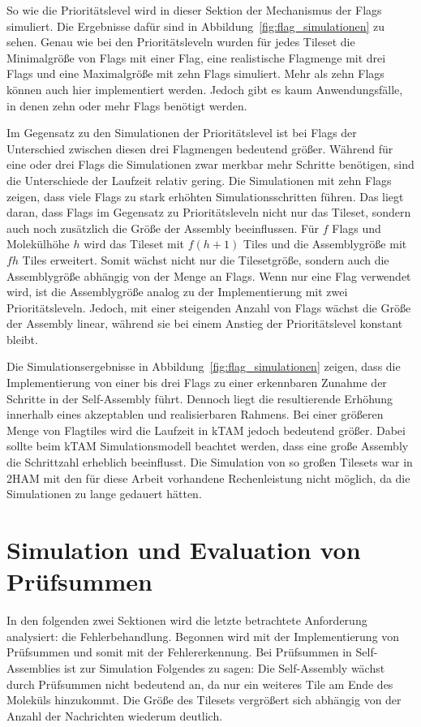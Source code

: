 So wie die Prioritätslevel wird in dieser Sektion der Mechanismus der Flags simuliert. Die Ergebnisse dafür sind in Abbildung~\ref{fig:flag_simulationen} zu sehen. Genau wie bei den Prioritätsleveln wurden für jedes Tileset die Minimalgröße von Flags mit einer Flag, eine realistische Flagmenge mit drei Flags und eine Maximalgröße mit zehn Flags simuliert. Mehr als zehn Flags können auch hier implementiert werden. Jedoch gibt es kaum Anwendungsfälle, in denen zehn oder mehr Flags benötigt werden. 

Im Gegensatz zu den Simulationen der Prioritätslevel ist bei Flags der Unterschied zwischen diesen drei Flagmengen bedeutend größer. Während für eine oder drei Flags die Simulationen zwar merkbar mehr Schritte benötigen, sind die Unterschiede der Laufzeit relativ gering. Die Simulationen mit zehn Flags zeigen, dass viele Flags zu stark erhöhten Simulationsschritten führen. Das liegt daran, dass Flags im Gegensatz zu Prioritätsleveln nicht nur das Tileset, sondern auch noch zusätzlich die Größe der Assembly beeinflussen. Für $f$ Flags und Molekülhöhe $h$ wird das Tileset mit $f(h+1)$ Tiles und die Assemblygröße mit $fh$ Tiles erweitert. Somit wächst nicht nur die Tilesetgröße, sondern auch die Assemblygröße abhängig von der Menge an Flags. Wenn nur eine Flag verwendet wird, ist die Assemblygröße analog zu der Implementierung mit zwei Prioritätsleveln. Jedoch, mit einer steigenden Anzahl von Flags wächst die Größe der Assembly linear, während sie bei einem Anstieg der Prioritätslevel konstant bleibt.

Die Simulationsergebnisse in Abbildung~\ref{fig:flag_simulationen} zeigen, dass die Implementierung von einer bis drei Flags zu einer erkennbaren Zunahme der Schritte in der Self-Assembly führt. Dennoch liegt die resultierende Erhöhung innerhalb eines akzeptablen und realisierbaren Rahmens. Bei einer größeren Menge von Flagtiles wird die Laufzeit in kTAM jedoch bedeutend größer. Dabei sollte beim kTAM Simulationsmodell beachtet werden, dass eine große Assembly die Schrittzahl erheblich beeinflusst. Die Simulation von so großen Tilesets war in 2HAM mit den für diese Arbeit vorhandene Rechenleistung nicht möglich, da die Simulationen zu lange gedauert hätten.

\section{Simulation und Evaluation von Prüfsummen}

In den folgenden zwei Sektionen wird die letzte betrachtete Anforderung analysiert: die Fehlerbehandlung. Begonnen wird mit der Implementierung von Prüfsummen und somit mit der Fehlererkennung. Bei Prüfsummen in Self-Assemblies ist zur Simulation Folgendes zu sagen: Die Self-Assembly wächst durch Prüfsummen nicht bedeutend an, da nur ein weiteres Tile am Ende des Moleküls hinzukommt. Die Größe des Tilesets vergrößert sich abhängig von der Anzahl der Nachrichten wiederum deutlich. 

